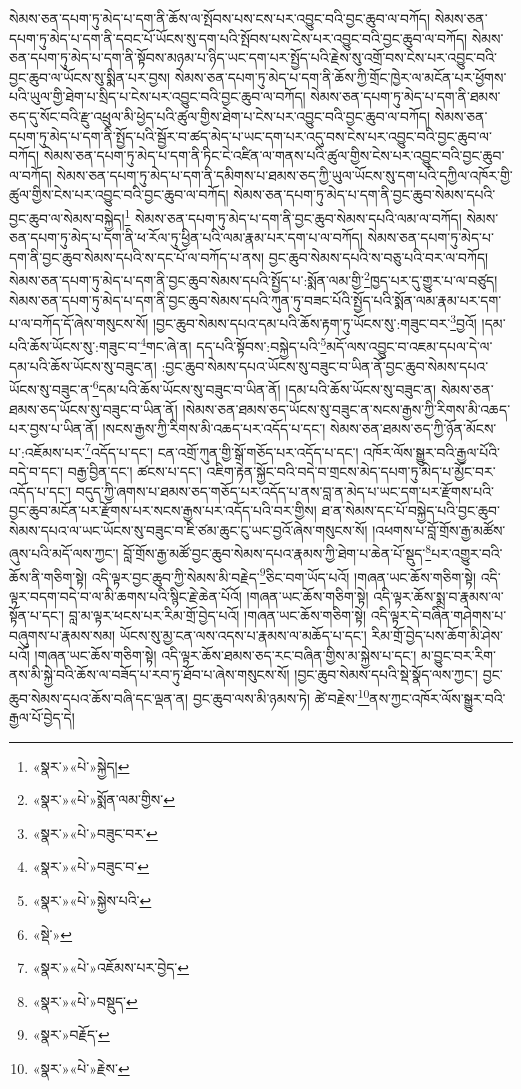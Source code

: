 སེམས་ཅན་དཔག་ཏུ་མེད་པ་དག་ནི་ཆོས་ལ་སྤོབས་པས་ངས་པར་འབྱུང་བའི་བྱང་ཆུབ་ལ་བཀོད། སེམས་ཅན་དཔག་ཏུ་མེད་པ་དག་ནི་དབང་པོ་ཡོངས་སུ་དག་པའི་སྤོབས་པས་ངེས་པར་འབྱུང་བའི་བྱང་ཆུབ་ལ་བཀོད། སེམས་ཅན་དཔག་ཏུ་མེད་པ་དག་ནི་སྟོབས་མཉམ་པ་ཉིད་ཡང་དག་པར་སྤྱོད་པའི་རྗེས་སུ་འགྲོ་བས་ངེས་པར་འབྱུང་བའི་བྱང་ཆུབ་ལ་ཡོངས་སུ་སྨིན་པར་བྱས། སེམས་ཅན་དཔག་ཏུ་མེད་པ་དག་ནི་ཆོས་ཀྱི་གྲོང་ཁྱེར་ལ་མངོན་པར་ཕྱོགས་པའི་ཡུལ་གྱི་ཐེག་པ་སྲིད་པ་ངེས་པར་འབྱུང་བའི་བྱང་ཆུབ་ལ་བཀོད། སེམས་ཅན་དཔག་ཏུ་མེད་པ་དག་ནི་ཐམས་ཅད་དུ་སོང་བའི་རྫུ་འཕྲུལ་མི་ཕྱེད་པའི་ཚུལ་གྱིས་ཐེག་པ་ངེས་པར་འབྱུང་བའི་བྱང་ཆུབ་ལ་བཀོད། སེམས་ཅན་དཔག་ཏུ་མེད་པ་དག་ནི་སྤྱོད་པའི་སྦྱོར་བ་ཚད་མེད་པ་ཡང་དག་པར་འདུ་བས་ངེས་པར་འབྱུང་བའི་བྱང་ཆུབ་ལ་བཀོད། སེམས་ཅན་དཔག་ཏུ་མེད་པ་དག་ནི་ཏིང་ངེ་འཛིན་ལ་གནས་པའི་ཚུལ་གྱིས་ངེས་པར་འབྱུང་བའི་བྱང་ཆུབ་ལ་བཀོད། སེམས་ཅན་དཔག་ཏུ་མེད་པ་དག་ནི་དམིགས་པ་ཐམས་ཅད་ཀྱི་ཡུལ་ཡོངས་སུ་དག་པའི་དཀྱིལ་འཁོར་གྱི་ཚུལ་གྱིས་ངེས་པར་འབྱུང་བའི་བྱང་ཆུབ་ལ་བཀོད། སེམས་ཅན་དཔག་ཏུ་མེད་པ་དག་ནི་བྱང་ཆུབ་སེམས་དཔའི་བྱང་ཆུབ་ལ་སེམས་བསྐྱེད།\footnote{«སྣར་»«པེ་»སྐྱེད།} སེམས་ཅན་དཔག་ཏུ་མེད་པ་དག་ནི་བྱང་ཆུབ་སེམས་དཔའི་ལམ་ལ་བཀོད། སེམས་ཅན་དཔག་ཏུ་མེད་པ་དག་ནི་ཕ་རོལ་ཏུ་ཕྱིན་པའི་ལམ་རྣམ་པར་དག་པ་ལ་བཀོད། སེམས་ཅན་དཔག་ཏུ་མེད་པ་དག་ནི་བྱང་ཆུབ་སེམས་དཔའི་ས་དང་པོ་ལ་བཀོད་པ་ནས། བྱང་ཆུབ་སེམས་དཔའི་ས་བཅུ་པའི་བར་ལ་བཀོད། སེམས་ཅན་དཔག་ཏུ་མེད་པ་དག་ནི་བྱང་ཆུབ་སེམས་དཔའི་སྤྱོད་པ་:སྨོན་ལམ་གྱི་\footnote{«སྣར་»«པེ་»སྨོན་ལམ་གྱིས་}ཁྱད་པར་དུ་གྱུར་པ་ལ་བཙུད། སེམས་ཅན་དཔག་ཏུ་མེད་པ་དག་ནི་བྱང་ཆུབ་སེམས་དཔའི་ཀུན་ཏུ་བཟང་པོའི་སྤྱོད་པའི་སྨོན་ལམ་རྣམ་པར་དག་པ་ལ་བཀོད་དོ་ཞེས་གསུངས་སོ། །བྱང་ཆུབ་སེམས་དཔའ་དམ་པའི་ཆོས་རྟག་ཏུ་ཡོངས་སུ་:གཟུང་བར་\footnote{«སྣར་»«པེ་»བཟུང་བར་}བྱའོ། །དམ་པའི་ཆོས་ཡོངས་སུ་:གཟུང་བ་\footnote{«སྣར་»«པེ་»བཟུང་བ་}གང་ཞེ་ན། དད་པའི་སྟོབས་:བསྐྱེད་པའི་\footnote{«སྣར་»«པེ་»སྐྱེས་པའི་}མདོ་ལས་འབྱུང་བ་འཇམ་དཔལ་དེ་ལ་དམ་པའི་ཆོས་ཡོངས་སུ་བཟུང་ན། :བྱང་ཆུབ་སེམས་དཔའ་ཡོངས་སུ་བཟུང་བ་ཡིན་ནོ་བྱང་ཆུབ་སེམས་དཔའ་ཡོངས་སུ་བཟུང་ན་\footnote{«སྡེ་»}དམ་པའི་ཆོས་ཡོངས་སུ་བཟུང་བ་ཡིན་ནོ། །དམ་པའི་ཆོས་ཡོངས་སུ་བཟུང་ན། སེམས་ཅན་ཐམས་ཅད་ཡོངས་སུ་བཟུང་བ་ཡིན་ནོ། །སེམས་ཅན་ཐམས་ཅད་ཡོངས་སུ་བཟུང་ན་སངས་རྒྱས་ཀྱི་རིགས་མི་འཆད་པར་བྱས་པ་ཡིན་ནོ། །སངས་རྒྱས་ཀྱི་རིགས་མི་འཆད་པར་འདོད་པ་དང་། སེམས་ཅན་ཐམས་ཅད་ཀྱི་ཉོན་མོངས་པ་:འཇོམས་པར་\footnote{«སྣར་»«པེ་»འཇོམས་པར་བྱེད་}འདོད་པ་དང་། ངན་འགྲོ་ཀུན་གྱི་སྒོ་གཅོད་པར་འདོད་པ་དང་། འཁོར་ལོས་སྒྱུར་བའི་རྒྱལ་པོའི་བདེ་བ་དང་། བརྒྱ་བྱིན་དང་། ཚངས་པ་དང་། འཇིག་རྟེན་སྐྱོང་བའི་བདེ་བ་གྲངས་མེད་དཔག་ཏུ་མེད་པ་མྱོང་བར་འདོད་པ་དང་། བདུད་ཀྱི་ཞགས་པ་ཐམས་ཅད་གཅོད་པར་འདོད་པ་ནས་བླ་ན་མེད་པ་ཡང་དག་པར་རྫོགས་པའི་བྱང་ཆུབ་མངོན་པར་རྫོགས་པར་སངས་རྒྱས་པར་འདོད་པའི་བར་གྱིས། ཐ་ན་སེམས་དང་པོ་བསྐྱེད་པའི་བྱང་ཆུབ་སེམས་དཔའ་ལ་ཡང་ཡོངས་སུ་བཟུང་བ་ཇི་ཙམ་ཆུང་ངུ་ཡང་བྱའོ་ཞེས་གསུངས་སོ། །འཕགས་པ་བློ་གྲོས་རྒྱ་མཚོས་ཞུས་པའི་མདོ་ལས་ཀྱང་། བློ་གྲོས་རྒྱ་མཚོ་བྱང་ཆུབ་སེམས་དཔའ་རྣམས་ཀྱི་ཐེག་པ་ཆེན་པོ་སྡུད་\footnote{«སྣར་»«པེ་»བསྡུད་}པར་འགྱུར་བའི་ཆོས་ནི་གཅིག་སྟེ། འདི་ལྟར་བྱང་ཆུབ་ཀྱི་སེམས་མི་བརྗེད་\footnote{«སྣར་»བརྗོད་}ཅིང་བག་ཡོད་པའོ། །གཞན་ཡང་ཆོས་གཅིག་སྟེ། འདི་ལྟར་བདག་བདེ་བ་ལ་མི་ཆགས་པའི་སྙིང་རྗེ་ཆེན་པོའོ། །གཞན་ཡང་ཆོས་གཅིག་སྟེ། འདི་ལྟར་ཆོས་སྨྲ་བ་རྣམས་ལ་སྟོན་པ་དང་། བླ་མ་ལྟར་ཕངས་པར་རིམ་གྲོ་བྱེད་པའོ། །གཞན་ཡང་ཆོས་གཅིག་སྟེ། འདི་ལྟར་དེ་བཞིན་གཤེགས་པ་བཞུགས་པ་རྣམས་སམ། ཡོངས་སུ་མྱ་ངན་ལས་འདས་པ་རྣམས་ལ་མཆོད་པ་དང་། རིམ་གྲོ་བྱེད་པས་ཆོག་མི་ཤེས་པའོ། །གཞན་ཡང་ཆོས་གཅིག་སྟེ། འདི་ལྟར་ཆོས་ཐམས་ཅད་རང་བཞིན་གྱིས་མ་སྐྱེས་པ་དང་། མ་བྱུང་བར་རིག་ནས་མི་སྐྱེ་བའི་ཆོས་ལ་བཟོད་པ་རབ་ཏུ་ཐོབ་པ་ཞེས་གསུངས་སོ། །བྱང་ཆུབ་སེམས་དཔའི་སྡེ་སྣོད་ལས་ཀྱང་། བྱང་ཆུབ་སེམས་དཔའ་ཆོས་བཞི་དང་ལྡན་ན། བྱང་ཆུབ་ལས་མི་ཉམས་ཏེ། ཚེ་བརྗེས་\footnote{«སྣར་»«པེ་»རྗེས་}ནས་ཀྱང་འཁོར་ལོས་སྒྱུར་བའི་རྒྱལ་པོ་བྱེད་དེ། 